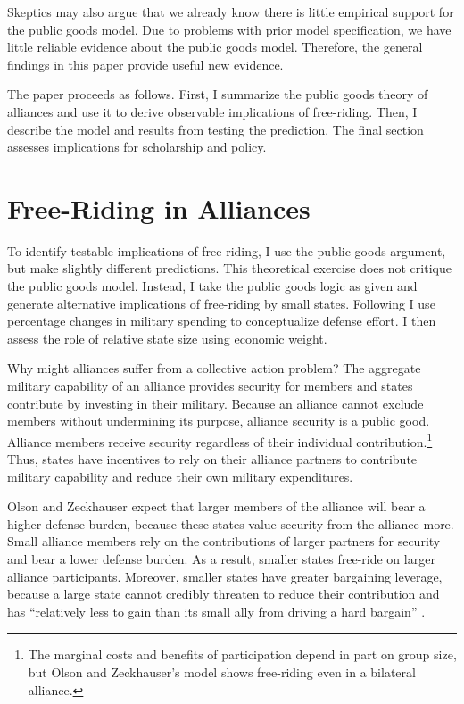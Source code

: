 \documentclass[12pt]{article}
\begin{document}
Skeptics may also argue that we already know there is little empirical support for the public goods model. 
Due to problems with prior model specification, we have little reliable evidence about the public goods model. 
Therefore, the general findings in this paper provide useful new evidence. 


The paper proceeds as follows.
First, I summarize the public goods theory of alliances and use it to derive observable implications of free-riding.
Then, I describe the model and results from testing the prediction. 
The final section assesses implications for scholarship and policy. 



\section{Free-Riding in Alliances}

To identify testable implications of free-riding, I use the public goods argument, but make slightly different predictions.
This theoretical exercise does not critique the public goods model.
Instead, I take the public goods logic as given and generate alternative implications of free-riding by small states. 
Following \citet{PluemperNeumayer2015} I use percentage changes in military spending to conceptualize defense effort.
I then assess the role of relative state size using economic weight. 


Why might alliances suffer from a collective action problem?
The aggregate military capability of an alliance provides security for members and states contribute by investing in their military.
Because an alliance cannot exclude members without undermining its purpose, alliance security is a public good. 
Alliance members receive security regardless of their individual contribution.\footnote{The marginal costs and benefits of participation depend in part on group size, but Olson and Zeckhauser's model shows free-riding even in a bilateral alliance.}
Thus, states have incentives to rely on their alliance partners to contribute military capability and reduce their own military expenditures.  

 
Olson and Zeckhauser expect that larger members of the alliance will bear a higher defense burden, because these states value security from the alliance more.
Small alliance members rely on the contributions of larger partners for security and bear a lower defense burden.
As a result, smaller states free-ride on larger alliance participants. 
Moreover, smaller states have greater bargaining leverage, because a large state cannot credibly threaten to reduce their contribution and has ``relatively less to gain than its small ally from driving a hard bargain'' \citep[pg. 274]{OlsonZeckhauser1966}. 
\end{document}
